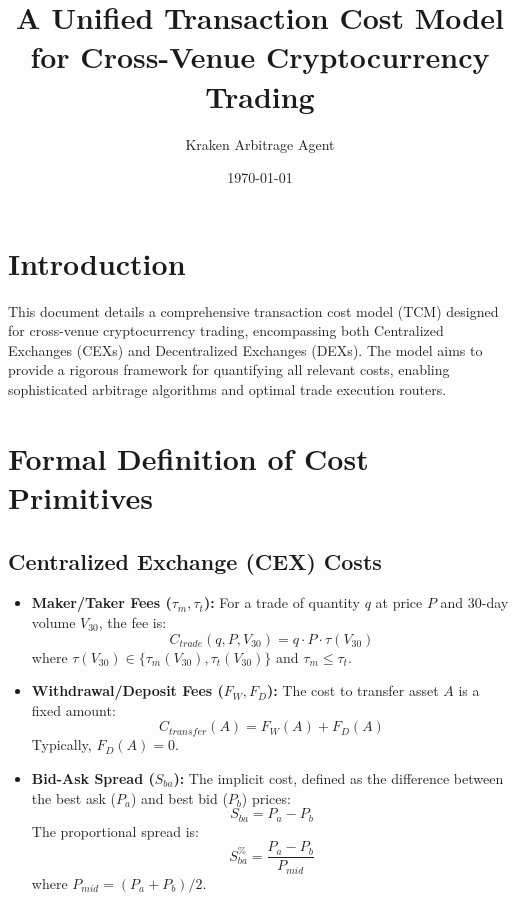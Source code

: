 \documentclass{article}
\begin{document}
\title{A Unified Transaction Cost Model for Cross-Venue Cryptocurrency Trading}
\author{Kraken Arbitrage Agent}
\date{\today}
\maketitle

\section{Introduction}
This document details a comprehensive transaction cost model (TCM) designed for cross-venue cryptocurrency trading, encompassing both Centralized Exchanges (CEXs) and Decentralized Exchanges (DEXs). The model aims to provide a rigorous framework for quantifying all relevant costs, enabling sophisticated arbitrage algorithms and optimal trade execution routers.

\section{Formal Definition of Cost Primitives}

\subsection{Centralized Exchange (CEX) Costs}
\begin{itemize}
    \item \textbf{Maker/Taker Fees ($\tau_m, \tau_t$):} For a trade of quantity $q$ at price $P$ and 30-day volume $V_{30}$, the fee is:
    $$C_{trade}(q, P, V_{30}) = q \cdot P \cdot \tau(V_{30})$$
    where $\tau(V_{30}) \in \{\tau_m(V_{30}), \tau_t(V_{30})\}$ and $\tau_m \le \tau_t$.

    \item \textbf{Withdrawal/Deposit Fees ($F_W, F_D$):} The cost to transfer asset $A$ is a fixed amount:
    $$C_{transfer}(A) = F_W(A) + F_D(A)$$
    Typically, $F_D(A) = 0$.

    \item \textbf{Bid-Ask Spread ($S_{ba}$):} The implicit cost, defined as the difference between the best ask ($P_a$) and best bid ($P_b$) prices:
    $$S_{ba} = P_a - P_b$$
    The proportional spread is:
    $$S_{ba}^{\%} = \frac{P_a - P_b}{P_{mid}}$$
    where $P_{mid} = (P_a + P_b)/2$.
\end{itemize}
\end{document}
